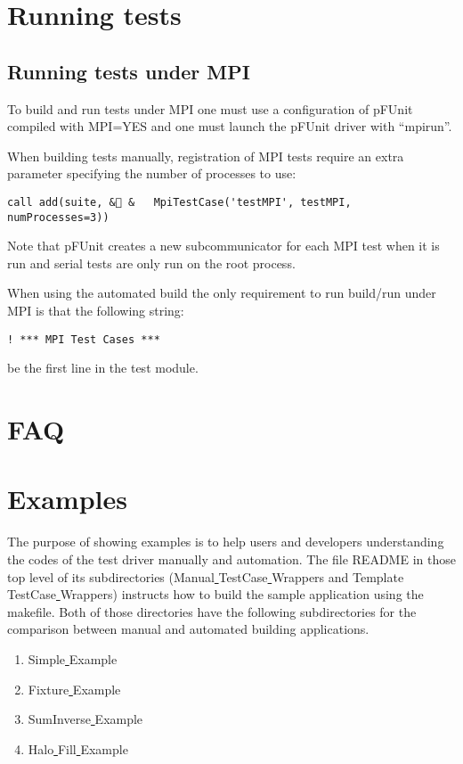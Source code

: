 \documentclass[10pt]{article}
\newcommand{\pfunit}{{\sc pFUnit }}
\begin{document}
\section{Running tests}
\subsection{Running tests under MPI}

To build and run tests under MPI one must use a configuration of
\pfunit compiled with MPI=YES and one must launch the \pfunit driver
with ``mpirun''.

When building tests manually, registration of MPI tests require an
extra parameter specifying the number of processes to use:

\begin{verbatim}
call add(suite, & &   MpiTestCase('testMPI', testMPI, numProcesses=3))
\end{verbatim}

Note that \pfunit creates a new subcommunicator for each MPI test when it is run
and serial tests are only run on the root process. 

When using the automated build the only requirement to run build/run
under MPI is that the following string:

\begin{verbatim}
! *** MPI Test Cases ***
\end{verbatim}

be the first line in the test module.

\section{FAQ}


\section{Examples}
The purpose of showing examples is to help users and developers understanding the codes of the test driver manually and automation.   The file README in those top level of its subdirectories (Manual\underline{ }TestCase\underline{ }Wrappers and Template\underline{ }TestCase\underline{ }Wrappers) instructs how to build the sample application using the makefile.    Both of those directories have the following subdirectories for the comparison between manual and automated building applications.    
\begin{enumerate}
\item Simple\underline{ }Example
\item Fixture\underline{ }Example
\item SumInverse\underline{ }Example
\item Halo\underline{ }Fill\underline{ }Example
\end{enumerate}
\end{document}
